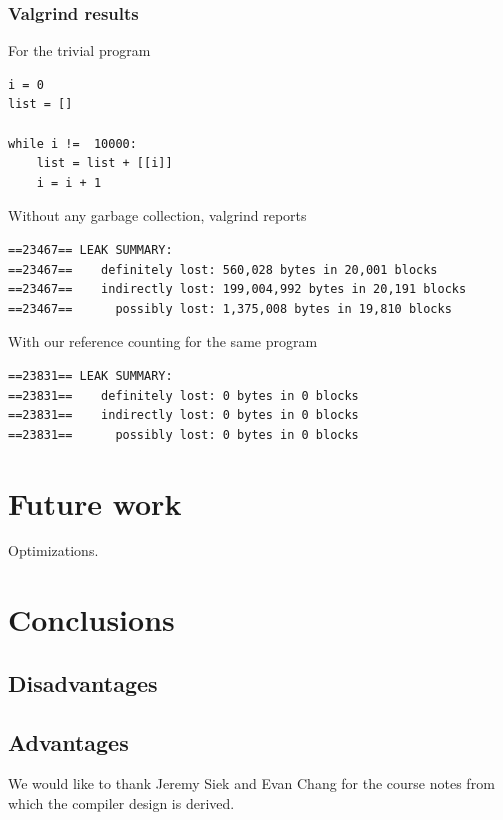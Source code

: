 \documentclass{sigplanconf}
\begin{document}
\subsubsection{Valgrind results}
For the trivial program
\begin{verbatim}
i = 0
list = []

while i !=  10000:
    list = list + [[i]]
    i = i + 1

\end{verbatim}
Without any garbage collection, valgrind reports 
\begin{verbatim}
==23467== LEAK SUMMARY:
==23467==    definitely lost: 560,028 bytes in 20,001 blocks
==23467==    indirectly lost: 199,004,992 bytes in 20,191 blocks
==23467==      possibly lost: 1,375,008 bytes in 19,810 blocks
\end{verbatim}
With our reference counting for the same program
\begin{verbatim}
==23831== LEAK SUMMARY:
==23831==    definitely lost: 0 bytes in 0 blocks
==23831==    indirectly lost: 0 bytes in 0 blocks
==23831==      possibly lost: 0 bytes in 0 blocks
\end{verbatim}

\section{Future work}
\label{sec:future}

Optimizations.

\section{Conclusions}
\label{sec:conclusion}

\subsection{Disadvantages}

\subsection{Advantages}


\acks

We would like to thank Jeremy Siek and Evan Chang for the course notes from which the compiler design is derived.
\end{document}

